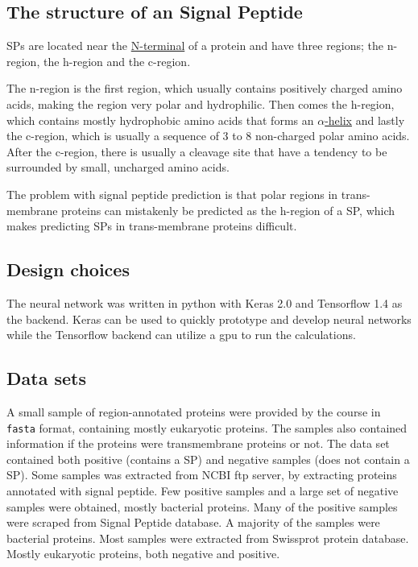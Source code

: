 \subsection{The structure of an Signal Peptide}

SPs are located near the \href{https://en.wikipedia.org/wiki/N-terminus}{N-terminal} of a protein and have three regions; the n-region, the h-region and the c-region.

The n-region is the first region, which usually contains positively charged amino acids, making the region very polar and hydrophilic. Then comes the h-region, which contains mostly hydrophobic amino acids that forms an \href{https://en.wikipedia.org/wiki/Alpha_helix}{$\alpha$-helix} and lastly the c-region, which is usually a sequence of 3 to 8 non-charged polar amino acids. After the c-region, there is usually a cleavage site that have a tendency to be surrounded by small, uncharged amino acids.

The problem with signal peptide prediction is that polar regions in trans-membrane proteins can mistakenly be predicted as the h-region of a SP, which makes predicting SPs in trans-membrane proteins difficult.

\subsection{Design choices}
The neural network was written in python with Keras 2.0 and Tensorflow 1.4 as the backend. Keras can be used to quickly prototype and develop neural networks while the Tensorflow backend can utilize a gpu to run the calculations.

\subsection{Data sets}

A small sample of region-annotated proteins were provided by the course in \verb|fasta| format, containing mostly eukaryotic proteins. The samples also contained information if the proteins were transmembrane proteins or not. The data set contained both positive (contains a SP) and negative samples (does not contain a SP).
Some samples was extracted from NCBI ftp server, by extracting proteins annotated with signal peptide. Few positive samples and a large set of negative samples were obtained, mostly bacterial proteins.
Many of the positive samples were scraped from Signal Peptide database. A majority of the samples were bacterial proteins.
Most samples were extracted from Swissprot protein database. Mostly eukaryotic proteins, both negative and positive.

